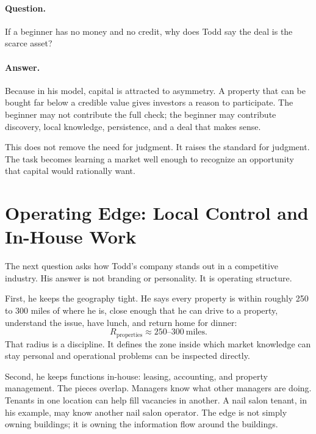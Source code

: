 \paragraph{Question.}
If a beginner has no money and no credit, why does Todd say the deal is the scarce asset?

\paragraph{Answer.}
Because in his model, capital is attracted to asymmetry. A property that can be bought far below a credible value gives investors a reason to participate. The beginner may not contribute the full check; the beginner may contribute discovery, local knowledge, persistence, and a deal that makes sense.

This does not remove the need for judgment. It raises the standard for judgment. The task becomes learning a market well enough to recognize an opportunity that capital would rationally want.

\section{Operating Edge: Local Control and In-House Work}

The next question asks how Todd's company stands out in a competitive industry. His answer is not branding or personality. It is operating structure.

First, he keeps the geography tight. He says every property is within roughly 250 to 300 miles of where he is, close enough that he can drive to a property, understand the issue, have lunch, and return home for dinner:
\begin{equation}
R_{\mathrm{properties}}\approx 250\text{--}300\ \mathrm{miles}.
\end{equation}
That radius is a discipline. It defines the zone inside which market knowledge can stay personal and operational problems can be inspected directly.

Second, he keeps functions in-house: leasing, accounting, and property management. The pieces overlap. Managers know what other managers are doing. Tenants in one location can help fill vacancies in another. A nail salon tenant, in his example, may know another nail salon operator. The edge is not simply owning buildings; it is owning the information flow around the buildings.


